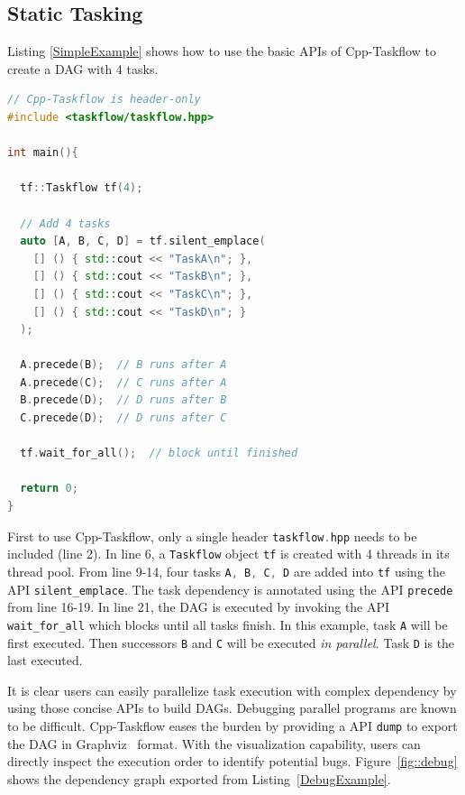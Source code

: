 \documentclass[sigconf]{acmart}
\def\codeinline{\lstinline[basicstyle=\normalsize\color{darkgray},language=C++]}
\begin{document}
\subsection{Static Tasking}
Listing \ref{SimpleExample} shows how to use the basic APIs of Cpp-Taskflow to create a DAG with 4 tasks.

\begin{lstlisting}[language=C++,label=SimpleExample,caption={A simple example.}]
// Cpp-Taskflow is header-only
#include <taskflow/taskflow.hpp>  

int main(){
  
  tf::Taskflow tf(4);

  // Add 4 tasks
  auto [A, B, C, D] = tf.silent_emplace(
    [] () { std::cout << "TaskA\n"; },               
    [] () { std::cout << "TaskB\n"; },               
    [] () { std::cout << "TaskC\n"; },               
    [] () { std::cout << "TaskD\n"; }                
  );                                                 
                                                     
  A.precede(B);  // B runs after A                   
  A.precede(C);  // C runs after A                   
  B.precede(D);  // D runs after B                   
  C.precede(D);  // D runs after C                   
                                                     
  tf.wait_for_all();  // block until finished

  return 0;
}
\end{lstlisting} 

First to use Cpp-Taskflow, only a single header \codeinline{taskflow.hpp} needs
to be included (line 2).  In line 6, a \codeinline{Taskflow} object
\codeinline{tf} is created with 4 threads in its thread pool. From line 9-14,
four tasks \codeinline{A, B, C, D} are added into \codeinline{tf} using the API
\codeinline{silent_emplace}.  The task dependency is annotated using the API
\codeinline{precede} from line 16-19. In line 21, the DAG is executed by
invoking the API \codeinline{wait_for_all} which blocks until all tasks finish.
In this example, task \codeinline{A} will be first executed. Then  successors
\codeinline{B} and \codeinline{C} will be executed \emph{in parallel}. Task
\codeinline{D} is the last executed.

It is clear users can easily parallelize task execution with complex dependency 
by using those concise APIs to build DAGs. Debugging parallel programs are known 
to be difficult. Cpp-Taskflow eases the burden by providing a API
\codeinline{dump} to export the DAG in Graphviz~\cite{graphviz} format. 
With the visualization capability, users can directly inspect the execution order 
to identify potential bugs.  Figure~\ref{fig::debug}
shows the dependency graph exported from Listing~\ref{DebugExample}.
\end{document}
